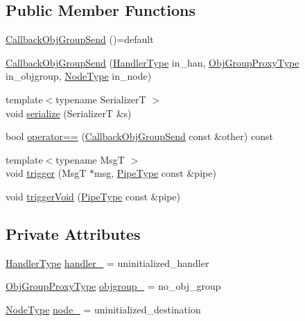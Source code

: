 \subsection*{Public Member Functions}
\begin{DoxyCompactItemize}
\item 
\hyperlink{structvt_1_1pipe_1_1callback_1_1_callback_obj_group_send_ad23abb2b17572d769a347984efe6441b}{Callback\+Obj\+Group\+Send} ()=default
\item 
\hyperlink{structvt_1_1pipe_1_1callback_1_1_callback_obj_group_send_a4ddc589bf578055a3e96b62be954c12e}{Callback\+Obj\+Group\+Send} (\hyperlink{namespacevt_af64846b57dfcaf104da3ef6967917573}{Handler\+Type} in\+\_\+han, \hyperlink{namespacevt_ad7cae989df485fccca57f0792a880a8e}{Obj\+Group\+Proxy\+Type} in\+\_\+objgroup, \hyperlink{namespacevt_a866da9d0efc19c0a1ce79e9e492f47e2}{Node\+Type} in\+\_\+node)
\item 
{\footnotesize template$<$typename SerializerT $>$ }\\void \hyperlink{structvt_1_1pipe_1_1callback_1_1_callback_obj_group_send_a703ca9f56b2d1927b098a5889326a758}{serialize} (SerializerT \&s)
\item 
bool \hyperlink{structvt_1_1pipe_1_1callback_1_1_callback_obj_group_send_a32e50947e4799023db35e63f80575c63}{operator==} (\hyperlink{structvt_1_1pipe_1_1callback_1_1_callback_obj_group_send}{Callback\+Obj\+Group\+Send} const \&other) const
\item 
{\footnotesize template$<$typename MsgT $>$ }\\void \hyperlink{structvt_1_1pipe_1_1callback_1_1_callback_obj_group_send_a40f0cd87224b51fdbfffacfe80bdde35}{trigger} (MsgT $\ast$msg, \hyperlink{namespacevt_ac9852acda74d1896f48f406cd72c7bd3}{Pipe\+Type} const \&pipe)
\item 
void \hyperlink{structvt_1_1pipe_1_1callback_1_1_callback_obj_group_send_a9c15cb84991c601f50eede9d41ef811c}{trigger\+Void} (\hyperlink{namespacevt_ac9852acda74d1896f48f406cd72c7bd3}{Pipe\+Type} const \&pipe)
\end{DoxyCompactItemize}
\subsection*{Private Attributes}
\begin{DoxyCompactItemize}
\item 
\hyperlink{namespacevt_af64846b57dfcaf104da3ef6967917573}{Handler\+Type} \hyperlink{structvt_1_1pipe_1_1callback_1_1_callback_obj_group_send_a7094a47cb936ccb444824384f5f2d57d}{handler\+\_\+} = uninitialized\+\_\+handler
\item 
\hyperlink{namespacevt_ad7cae989df485fccca57f0792a880a8e}{Obj\+Group\+Proxy\+Type} \hyperlink{structvt_1_1pipe_1_1callback_1_1_callback_obj_group_send_a975adbdb55edfb825eeb61602a06c562}{objgroup\+\_\+} = no\+\_\+obj\+\_\+group
\item 
\hyperlink{namespacevt_a866da9d0efc19c0a1ce79e9e492f47e2}{Node\+Type} \hyperlink{structvt_1_1pipe_1_1callback_1_1_callback_obj_group_send_af35c63aed6fa74b41ff75d54216bdc0c}{node\+\_\+} = uninitialized\+\_\+destination
\end{DoxyCompactItemize}


